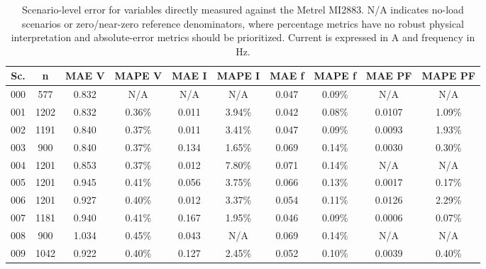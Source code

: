 \documentclass[technologies,article,submit,pdftex,moreauthors]{Definitions/mdpi}
\begin{document}
\begin{table}
\caption{Scenario-level error for variables directly measured against the Metrel MI2883. N/A indicates no-load scenarios or zero/near-zero reference denominators, where percentage metrics have no robust physical interpretation and absolute-error metrics should be prioritized. Current is expressed in A and frequency in Hz.}
\label{tab:error-por-escenario-para-variables-medidas-di}
\centering
\scriptsize
\begin{adjustbox}{max width=0.8\textwidth}
\begin{tabular}{cccccccccc}
\toprule
Sc. & n & MAE V & MAPE V & MAE I & MAPE I & MAE f & MAPE f & MAE PF & MAPE PF \\
\midrule
000 & 577 & 0.832 & N/A & N/A & N/A & 0.047 & 0.09\% & N/A & N/A \\
001 & 1202 & 0.832 & 0.36\% & 0.011 & 3.94\% & 0.042 & 0.08\% & 0.0107 & 1.09\% \\
002 & 1191 & 0.840 & 0.37\% & 0.011 & 3.41\% & 0.047 & 0.09\% & 0.0093 & 1.93\% \\
003 & 900 & 0.840 & 0.37\% & 0.134 & 1.65\% & 0.069 & 0.14\% & 0.0030 & 0.30\% \\
004 & 1201 & 0.853 & 0.37\% & 0.012 & 7.80\% & 0.071 & 0.14\% & N/A & N/A \\
005 & 1201 & 0.945 & 0.41\% & 0.056 & 3.75\% & 0.066 & 0.13\% & 0.0017 & 0.17\% \\
006 & 1201 & 0.927 & 0.40\% & 0.012 & 3.37\% & 0.054 & 0.11\% & 0.0126 & 2.29\% \\
007 & 1181 & 0.940 & 0.41\% & 0.167 & 1.95\% & 0.046 & 0.09\% & 0.0006 & 0.07\% \\
008 & 900 & 1.034 & 0.45\% & 0.043 & N/A & 0.069 & 0.14\% & N/A & N/A \\
009 & 1042 & 0.922 & 0.40\% & 0.127 & 2.45\% & 0.052 & 0.10\% & 0.0039 & 0.40\% \\
\bottomrule
\end{tabular}
\end{adjustbox}
\end{table}
\end{document}
